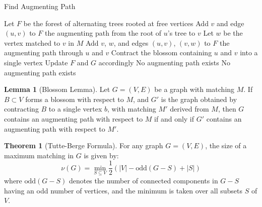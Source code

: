\documentclass{article}
\theoremstyle{definition}
\newtheorem{theorem}{Theorem}
\newtheorem{lemma}{Lemma}
\begin{document}
\begin{algorithm}
\caption{Find Augmenting Path}
\begin{algorithmic}[1]
    \State Let $F$ be the forest of alternating trees rooted at free vertices
            \State Add $v$ and edge $(u, v)$ to $F$
            \State \Return the augmenting path from the root of $u$'s tree to $v$
            \State Let $w$ be the vertex matched to $v$ in $M$
            \State Add $v$, $w$, and edges $(u, v)$, $(v, w)$ to $F$
            \State \Return the augmenting path through $u$ and $v$
            \State Contract the blossom containing $u$ and $v$ into a single vertex
            \State Update $F$ and $G$ accordingly
        \Else
            \State \Return No augmenting path exists
        \EndIf
    \EndWhile
    \State \Return No augmenting path exists
\EndProcedure
\end{algorithmic}
\end{algorithm}


\begin{lemma}[Blossom Lemma]
Let $G = (V, E)$ be a graph with matching $M$. If $B \subset V$ forms a blossom with respect to $M$, and $G'$ is the graph obtained by contracting $B$ to a single vertex $b$, with matching $M'$ derived from $M$, then $G$ contains an augmenting path with respect to $M$ if and only if $G'$ contains an augmenting path with respect to $M'$.
\end{lemma}

\begin{theorem}[Tutte-Berge Formula]
For any graph $G = (V, E)$, the size of a maximum matching in $G$ is given by:
\[
\nu(G) = \min_{S \subseteq V} \frac{1}{2}(|V| - \text{odd}(G - S) + |S|)
\]
where $\text{odd}(G - S)$ denotes the number of connected components in $G - S$ having an odd number of vertices, and the minimum is taken over all subsets $S$ of $V$.
\end{theorem}
\end{document}
